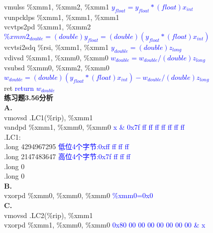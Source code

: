 \documentclass{article}
\newcommand{\blue}[1]{\textcolor{blue}{#1}}
\begin{document}
\begin{CJK}{UTF8}{gbsn}
\hspace*{1em}vmulss	\%xmm1, \%xmm2, \%xmm1 \blue{$y_{float}=y_{float}*(float)x_{int}$}	\\
\hspace*{1em}vunpcklps	\%xmm1, \%xmm1, \%xmm1 \blue{}	\\
\hspace*{1em}vcvtps2pd	\%xmm1, \%xmm2 \blue{$\%xmm2_{double}=(double)y_{float}=(double)(y_{float}*(float)x_{int})$}	\\
\hspace*{1em}vcvtsi2sdq	\%rsi, \%xmm1, \%xmm1 \blue{$y_{double}=(double)z_{long}$}	\\
\hspace*{1em}vdivsd	\%xmm1, \%xmm0, \%xmm0 \blue{$w_{double}=w_{double}/(double)z_{long}$}	\\
\hspace*{1em}vsubsd	\%xmm0, \%xmm2, \%xmm0 \blue{$w_{double}=(double)(y_{float}*(float)x_{int})-w_{double}/(double)z_{long}$}	\\
\hspace*{1em}ret \blue{return $w_{double}$}	\\[3ex]
\textbf{练习题3.56分析}	\\
\textbf{A.}	\\
	\hspace*{1em}vmovsd	.LC1(\%rip), \%xmm1	\\
	\hspace*{1em}vandpd	\%xmm1, \%xmm0, \%xmm0 \blue{x \& 0x7f ff ff ff ff ff ff ff}	\\
.LC1:	\\
	\hspace*{1em}.long	4294967295 \blue{低位4个字节:0xff ff ff ff}	\\
	\hspace*{1em}.long	2147483647 \blue{高位4个字节:0x7f ff ff ff}	\\
	\hspace*{1em}.long	0	\\
	\hspace*{1em}.long	0	\\
\textbf{B.}	\\
	\hspace*{1em}vxorpd	\%xmm0, \%xmm0, \%xmm0 \blue{\%xmm0=0x0}	\\
\textbf{C.}	\\
	\hspace*{1em}vmovsd	.LC2(\%rip), \%xmm1 \blue{}	\\
	\hspace*{1em}vxorpd	\%xmm1, \%xmm0, \%xmm0 \blue{0x80 00 00 00 00 00 00 00 \& x}	\\

\end{CJK}
\end{document}
